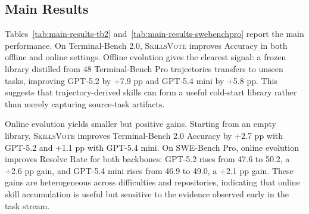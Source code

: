 \documentclass{llmxive}
\providecommand{\ours}{\textsc{SkillsVote}\xspace}
\providecommand{\svgain}[1]{#1}
\begin{document}
\subsection{Main Results}
Tables~\ref{tab:main-results-tb2} and~\ref{tab:main-results-swebenchpro} report the main performance. On Terminal-Bench 2.0, \ours improves Accuracy in both offline and online settings. Offline evolution gives the clearest signal: a frozen library distilled from 48 Terminal-Bench Pro trajectories transfers to unseen tasks, improving GPT-5.2 by \svgain{+7.9 pp} and GPT-5.4 mini by \svgain{+5.8 pp}. This suggests that trajectory-derived skills can form a useful cold-start library rather than merely capturing source-task artifacts.

Online evolution yields smaller but positive gains. Starting from an empty library, \ours improves Terminal-Bench 2.0 Accuracy by \svgain{+2.7 pp} with GPT-5.2 and \svgain{+1.1 pp} with GPT-5.4 mini. On SWE-Bench Pro, online evolution improves Resolve Rate for both backbones: GPT-5.2 rises from 47.6 to 50.2, a \svgain{+2.6 pp} gain, and GPT-5.4 mini rises from 46.9 to 49.0, a \svgain{+2.1 pp} gain. These gains are heterogeneous across difficulties and repositories, indicating that online skill accumulation is useful but sensitive to the evidence observed early in the task stream.
\end{document}
